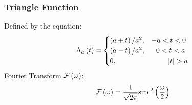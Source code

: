\subsubsection{Triangle Function}
Defined by the equation:
\begin{equation}
    \Lambda_a\left(t\right)=
    \begin{cases}
        \left(a+t\right)/a^2, & -a < t < 0 \\
        \left(a-t\right)/a^2, & \ \ 0 < t < a\\
        0, & \ \ \ \ \ \ \ \left|t\right| > a
    \end{cases}\\
\end{equation}
Fourier Transform $\mathcal{F}\left(\omega\right)$:
\begin{equation}
    \mathcal{F}\left(\omega\right)=\frac{1}{\sqrt{2\pi}}\text{sinc}^2\left(\frac{\omega}{2}\right)
\end{equation}
